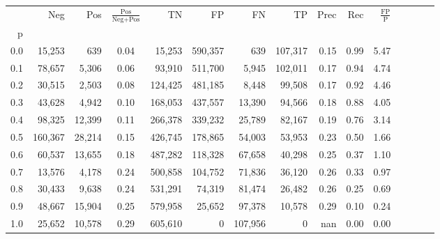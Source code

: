 \begin{tabular}{rrrcrrrrrrrrrrr}
\toprule
{} &      Neg &     Pos & $\frac{\text{Pos}}{\text{Neg}+\text{Pos}}$ &       TN &       FP &       FN &       TP &  Prec &   Rec & $\frac{\text{FP}}{\text{P}}$ \\
p   &          &         &                                            &          &          &          &          &       &       &                              \\
\midrule
0.0 &   15,253 &     639 &                                       0.04 &   15,253 &  590,357 &      639 &  107,317 &  0.15 &  0.99 &                         5.47 \\
0.1 &   78,657 &   5,306 &                                       0.06 &   93,910 &  511,700 &    5,945 &  102,011 &  0.17 &  0.94 &                         4.74 \\
0.2 &   30,515 &   2,503 &                                       0.08 &  124,425 &  481,185 &    8,448 &   99,508 &  0.17 &  0.92 &                         4.46 \\
0.3 &   43,628 &   4,942 &                                       0.10 &  168,053 &  437,557 &   13,390 &   94,566 &  0.18 &  0.88 &                         4.05 \\
0.4 &   98,325 &  12,399 &                                       0.11 &  266,378 &  339,232 &   25,789 &   82,167 &  0.19 &  0.76 &                         3.14 \\
0.5 &  160,367 &  28,214 &                                       0.15 &  426,745 &  178,865 &   54,003 &   53,953 &  0.23 &  0.50 &                         1.66 \\
0.6 &   60,537 &  13,655 &                                       0.18 &  487,282 &  118,328 &   67,658 &   40,298 &  0.25 &  0.37 &                         1.10 \\
0.7 &   13,576 &   4,178 &                                       0.24 &  500,858 &  104,752 &   71,836 &   36,120 &  0.26 &  0.33 &                         0.97 \\
0.8 &   30,433 &   9,638 &                                       0.24 &  531,291 &   74,319 &   81,474 &   26,482 &  0.26 &  0.25 &                         0.69 \\
0.9 &   48,667 &  15,904 &                                       0.25 &  579,958 &   25,652 &   97,378 &   10,578 &  0.29 &  0.10 &                         0.24 \\
1.0 &   25,652 &  10,578 &                                       0.29 &  605,610 &        0 &  107,956 &        0 &   nan &  0.00 &                         0.00 \\
\bottomrule
\end{tabular}
